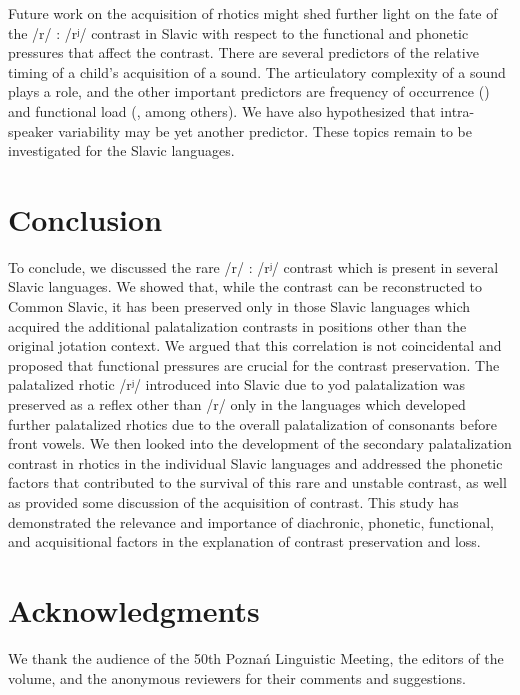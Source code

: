 \documentclass[output=paper]{langscibook}
\begin{document}
Future work on the acquisition of rhotics might shed further light on the fate of the /r/ : /rʲ/ contrast in Slavic with respect to the functional and phonetic pressures that affect the contrast. There are several predictors of the relative timing of a child’s acquisition of a sound. The articulatory complexity of a sound plays a role, and the other important predictors are frequency of occurrence (\citealt{Boysson-BardiesVihman1991,Ellis2002,EdwardsBeckman2008,EdwardsEtAl2015}) and functional load (\citealt{Hockett1955,Hockett1967,WedelEtAl2013a,Cychosz2017}, among others). We have also hypothesized that intra-speaker variability may be yet another predictor. These topics remain to be investigated for the Slavic languages.

\section{Conclusion}
\label{sec:kavitskaya:6}
To conclude, we discussed the rare /r/ : /rʲ/ contrast which is present in several Slavic languages. We showed that, while the contrast can be reconstructed to Common Slavic, it has been preserved only in those Slavic languages which acquired the additional palatalization contrasts in positions other than the original jotation context. We argued that this correlation is not coincidental and proposed that functional pressures are crucial for the contrast preservation. The palatalized rhotic /rʲ/ introduced into Slavic due to yod palatalization was preserved as a reflex other than /r/ only in the languages which developed further palatalized rhotics due to the overall palatalization of consonants before front vowels. We then looked into the development of the secondary palatalization contrast in rhotics in the individual Slavic languages and addressed the phonetic factors that contributed to the survival of this rare and unstable contrast, as well as provided some discussion of the acquisition of contrast. This study has demonstrated the relevance and importance of diachronic, phonetic, functional, and acquisitional factors in the explanation of contrast preservation and loss.

\section*{Acknowledgments}

We thank the audience of the 50th Poznań Linguistic Meeting, the editors of the volume, and the anonymous reviewers for their comments and suggestions.
\end{document}
